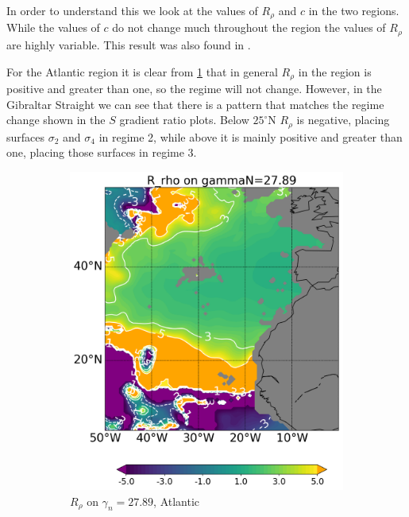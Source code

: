 In order to understand this we look at the values of $R_\rho$ and $c$ in the two regions. While the values of $c$ do not change much throughout the region the values of $R_\rho$ are highly variable. This result was also found in \citet{YOU2002}. 

For the Atlantic region it is clear from \ref{fig:subplot_atlantic_r_rho} that in general $R_\rho$ in the region is positive and greater than one, so the regime will not change. However, in the Gibraltar Straight we can see that there is a pattern that matches the regime change shown in the $S$ gradient ratio plots. Below $25^{\circ}$N $R_\rho$ is negative, placing surfaces $\sigma_2$ and $\sigma_4$ in regime 2, while above it is mainly positive and greater than one, placing those surfaces in regime 3. 

\begin{figure}[htbp]
    \centering
     \begin{subfigure}[b]{0.4\textwidth}
         
         \includegraphics[width=\textwidth]{plots/R_rho/atlantic_r_rho/Map2dcyl_R_rho_on_gammaN_2789e-2_reg310Eto360E05Nto57N_1990to1998av_WOCE.png}
         \caption{$R_\rho$ on $\gamma_n = 27.89$, Atlantic}
         \label{fig:subplot_atlantic_r_rho}
     \end{subfigure}
     \hfill
     \begin{subfigure}[b]{0.4\textwidth}
         

\end{subfigure}
\end{figure}
